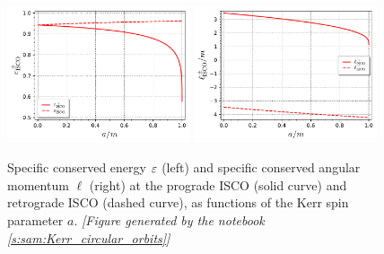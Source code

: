 \begin{figure}
\begin{center}
\includegraphics[width=0.48\textwidth]{gek_eps_isco.pdf}
\includegraphics[width=0.48\textwidth]{gek_ell_isco.pdf}
\end{center}
\caption[]{\label{f:gek:eps_ell_isco} \footnotesize
Specific conserved energy $\varepsilon$ (left) and specific conserved angular momentum $\ell$ (right)
at the prograde ISCO (solid curve) and retrograde ISCO (dashed curve),
as functions of the Kerr spin parameter $a$.
\textsl{[Figure generated by the notebook \ref{s:sam:Kerr_circular_orbits}]}
}
\end{figure}

